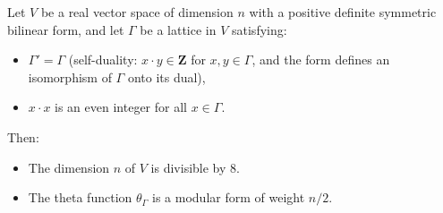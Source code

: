 Let $V$ be a real vector space of dimension $n$ with a positive definite symmetric bilinear form, and let $\Gamma$ be a lattice in $V$ satisfying:
\begin{itemize}
\item[(i)] $\Gamma' = \Gamma$ (self-duality: $x \cdot y \in \mathbf{Z}$ for $x,y \in \Gamma$, and the form defines an isomorphism of $\Gamma$ onto its dual),
\item[(ii)] $x \cdot x$ is an even integer for all $x \in \Gamma$.
\end{itemize}
Then:
\begin{itemize}
\item[(a)] The dimension $n$ of $V$ is divisible by $8$.
\item[(b)] The theta function $\theta_\Gamma$ is a modular form of weight $n/2$.
\end{itemize}
